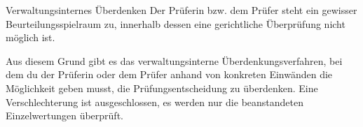 \begin{artikel}{Verwaltungsinternes Überdenken}
Der Prüferin bzw. dem Prüfer steht ein gewisser Beurteilungsspielraum zu, innerhalb dessen eine gerichtliche Überprüfung nicht möglich ist.

Aus diesem Grund gibt es das verwaltungsinterne Überdenkungsverfahren, bei dem du der Prüferin oder dem Prüfer anhand von konkreten Einwänden die Möglichkeit geben musst, die Prüfungsentscheidung zu überdenken. Eine Verschlechterung ist ausgeschlossen, es werden nur die beanstandeten Einzelwertungen überprüft.
\end{artikel}
